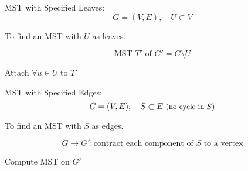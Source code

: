 \begin{frame}{}
  \begin{exampleblock}{MST with Specified Leaves: }
    \[
      G = (V, E), \quad U \subset V
    \]

    \centerline{To find an MST with $U$ as leaves.}
  \end{exampleblock}

  \pause

  \pause
  \vspace{-0.30cm}
  \[
    \text{MST } T' \text{ of } G' = G \setminus U
  \]

  \pause
  \centerline{Attach $\forall u \in U$ to $T'$ {}}
\end{frame}

\begin{frame}{}
  \begin{block}{MST with Specified Edges: }
    \[
      G = (V,E),\quad S \subset E \text{ \small (no cycle in $S$)}
    \]
    
    \centerline{To find an MST with $S$ as edges.}
  \end{block}

  \pause
  \[
    G \to G': \text{contract each component of $S$ to a vertex}
  \]

  \pause
  \centerline{Compute MST on $G'$}
\end{frame}
